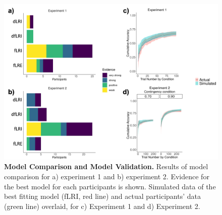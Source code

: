 \documentclass[a4paper,12pt]{article}
\begin{document}
\begin{figure}[ht!]
\centerline
{\includegraphics[width=1\textwidth]{figures/model_comp_and_valid.png}}
\caption{\textbf{Model Comparison and Model Validation.} Results of model comparison for a) experiment 1 and b) experiment 2. Evidence for the best model for each participants is shown. Simulated data of the best fitting model (fLRI, red line) and actual participants' data (green line)
overlaid, for c) Experiment 1 and d) Experiment 2.}
\label{fig:model_comp}
\end{figure}

\begin{table} 
    \centering 
    \caption{\label{tab:ModelComp}Model Comparison. BIC values and standard errors for each model for Experiment 1 and experiment 2. \textit{Best(N)} and \textit{Very strong(N)} refer to the number of participants for which the model was the best fit and for which there was very strong evidence, respectively.  }
    \end{table}
\end{document}
